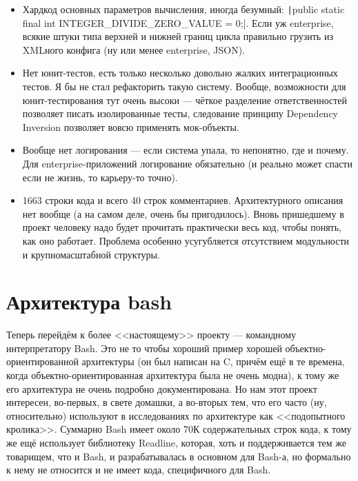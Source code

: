 \documentclass[a5paper]{article}
\begin{document}
\begin{itemize}
    \item Хардкод основных параметров вычисления, иногда безумный: \texttt|public static final int INTEGER_DIVIDE_ZERO_VALUE = 0;|. Если уж enterprise, всякие штуки типа верхней и нижней границ цикла правильно грузить из XMLного конфига (ну или менее enterprise, JSON).
    \item Нет юнит-тестов, есть только несколько довольно жалких интеграционных тестов. Я бы не стал рефакторить такую систему. Вообще, возможности для юнит-тестирования тут очень высоки --- чёткое разделение ответственностей позволяет писать изолированные тесты, следование принципу Dependency Inversion позволяет вовсю применять мок-объекты.
    \item Вообще нет логирования --- если система упала, то непонятно, где и почему. Для enterprise-приложений логирование обязательно (и реально может спасти если не жизнь, то карьеру-то точно).
    \item 1663 строки кода и всего 40 строк комментариев. Архитектурного описания нет вообще (а на самом деле, очень бы пригодилось). Вновь пришедшему в проект человеку надо будет прочитать практически весь код, чтобы понять, как оно работает. Проблема особенно усугубляется отсутствием модульности и крупномасштабной структуры.
\end{itemize}

\section{Архитектура bash}

Теперь перейдём к более <<настоящему>> проекту --- командному интерпретатору Bash. Это не то чтобы хороший пример хорошей объектно-ориентированной архитектуры (он был написан на C, причём ещё в те времена, когда объектно-ориентированная архитектура была не очень модна), к тому же его архитектура не очень подробно документирована. Но нам этот проект интересен, во-первых, в свете домашки, а во-вторых тем, что его часто (ну, относительно) используют в исследованиях по архитектуре как <<подопытного кролика>>. Суммарно Bash имеет около 70К содержательных строк кода, к тому же ещё использует библиотеку Readline, которая, хоть и поддерживается тем же товарищем, что и Bash, и разрабатывалась в основном для Bash-а, но формально к нему не относится и не имеет кода, специфичного для Bash.
\end{document}
